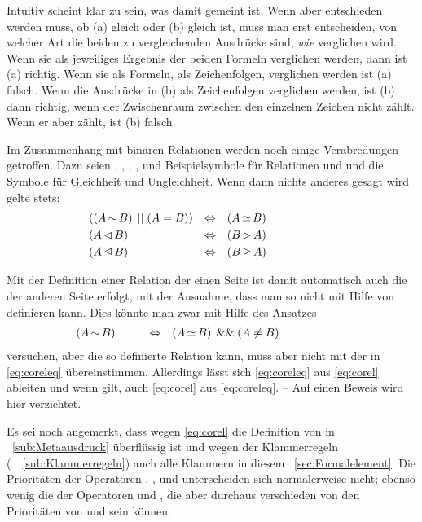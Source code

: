Intuitiv scheint klar zu sein, was damit  gemeint ist.
Wenn aber entschieden werden muss, ob \textzB (a)  gleich  oder (b)  gleich  ist, muss man erst entscheiden, von welcher Art die beiden zu vergleichenden Ausdrücke sind, \textdh \emph{wie} verglichen wird.
Wenn sie als jeweiliges Ergebnis der beiden Formeln verglichen werden, dann ist (a) richtig.
Wenn sie als Formeln, \textdh als Zeichenfolgen, verglichen werden ist (a) falsch.
Wenn die Ausdrücke in (b) als Zeichenfolgen verglichen werden, ist (b) dann richtig, wenn der Zwischenraum zwischen den einzelnen Zeichen nicht zählt.
Wenn er aber zählt, ist (b) falsch.

Im Zusammenhang mit binären Relationen werden noch einige Verabredungen getroffen.
Dazu seien , , , ,  und  Beispielsymbole für Relationen und  und  die Symbole für Gleichheit und Ungleichheit.
Wenn dann nichts anderes gesagt wird gelte stets:
\begin{align}
	& ((A \operatorname{\sim}   B) \operatorname{\;||\;} (A = B)) & \operatorname{\Leftrightarrow} &&& (A \operatorname{\simeq}  B)
	\label{eq:coreleq}   \\
	& (A \operatorname{\lhd}   B)                  & \operatorname{\Leftrightarrow} &&& (B \operatorname{\rhd}   A)
	\label{eq:colrrel}   \\
	& (A \operatorname{\unlhd} B)                  & \operatorname{\Leftrightarrow} &&& (B \operatorname{\unrhd} A)
	\label{eq:colrreleq} &&&&&&&&&&
\end{align}

Mit der Definition einer Relation der einen Seite ist damit automatisch auch die der anderen Seite erfolgt, mit der Ausnahme, dass man  so nicht mit Hilfe von  definieren kann.
Dies könnte man zwar mit Hilfe des Ansatzes
\begin{align}
	& (A \operatorname{\sim} B) &&&&& \operatorname{\Leftrightarrow} &&&
	(A \operatorname{\simeq} B) \operatorname{\;\&\&\;} (A \ne B) \label{eq:corel} &&&&&&&&&&
\end{align}
versuchen, aber die so definierte Relation \symqt{$\relbsp$} kann, muss aber nicht mit der in \eqref{eq:coreleq} übereinstimmen.
Allerdings lässt sich \eqref{eq:coreleq} aus \eqref{eq:corel} ableiten und wenn  gilt, auch \eqref{eq:corel} aus \eqref{eq:coreleq}.
-- Auf einen Beweis wird hier verzichtet.

Es sei noch angemerkt, dass wegen \eqref{eq:corel} die Definition von \symqt{$\metarep$} in \sectionname~\vref{sub:Metaausdruck} überflüssig ist und wegen der Klammerregeln (\seename\ \subsectionname~\vref{sub:Klammerregeln}) auch alle Klammern in diesem \sectionname~\ref{sec:Formalelement}.
Die Prioritäten der Operatoren \symqt{$\lrelbsp$}, \symqt{$\rrelbsp$}, \symqt{$\lreleqbsp$} und \symqt{$\rreleqbsp$} unterscheiden sich normalerweise nicht; ebenso wenig die der Operatoren \symqt{$\relbsp$} und \symqt{$\releqbsp$}, die aber durchaus verschieden von den Prioritäten von \symqt{$=$} und \symqt{$\ne$} sein können.

